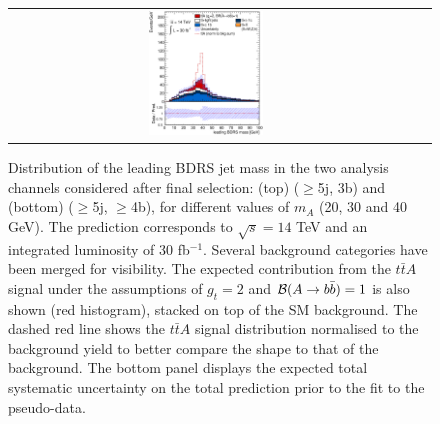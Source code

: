 \documentclass[preprintnumbers,superscriptaddress,nofootinbib,aps,prd,floatfix]{revtex4}
\newcommand{\ttbar}{\ensuremath{t\bar{t}}}
\begin{document}
\begin{figure}[htbp]
\begin{center}
\begin{tabular}{ccc}
\includegraphics[width=0.3\textwidth]{Figures/21stJuly/tta40/VD_2.eps} \\
\end{tabular}
\caption{\small {Distribution of the leading BDRS jet mass in the two analysis channels considered after final selection: 
(top) ($\geq$5j, 3b) and (bottom) ($\geq$5j, $\geq$4b), for different values of $m_A$ (20, 30 and 40 GeV).
The prediction corresponds to $\sqrt{s}=14$ TeV and an integrated luminosity of 30 fb$^{-1}$.
Several background categories have been merged for visibility. The expected contribution from 
the $\ttbar A$ signal under the assumptions of $g_t=2$ and ${\cal B}(A\to b\bar{b})=1$  is also shown
(red histogram), stacked on top of the SM background. The dashed red line shows the $\ttbar A$  signal 
distribution normalised to the background yield to better compare the shape to that of the background.
The bottom panel displays the expected total systematic uncertainty on the total prediction prior to the fit 
to the pseudo-data.}}
\label{fig:mA_1} 
\end{center}
\end{figure}
\end{document}
